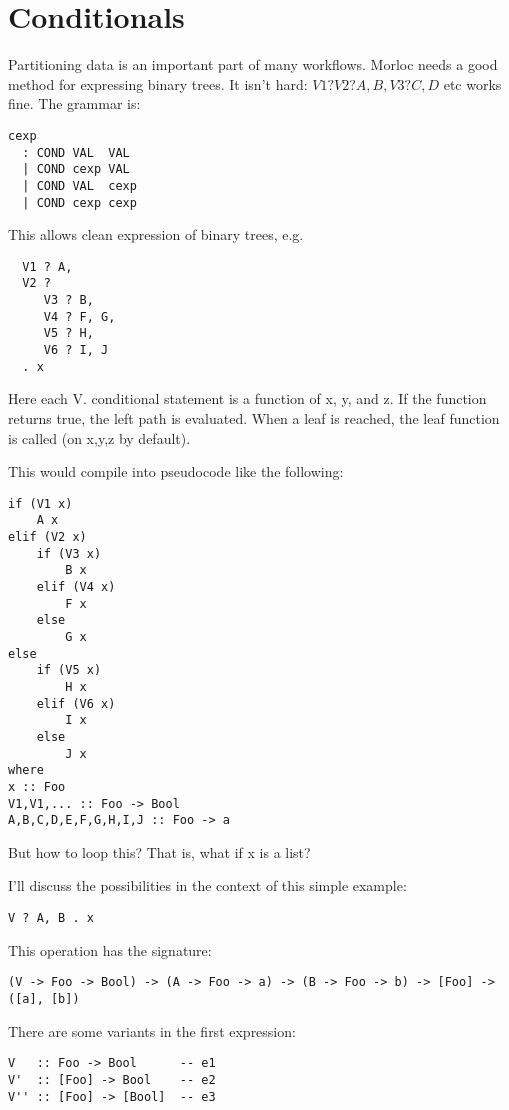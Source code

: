 \documentclass[12pt]{article}
\begin{document}
\section{Conditionals}

Partitioning data is an important part of many workflows. Morloc needs a good
method for expressing binary trees. It isn't hard: $V1 ? V2 ? A, B, V3 ? C, D$ etc
works fine. The grammar is:

\begin{verbatim}
cexp
  : COND VAL  VAL
  | COND cexp VAL
  | COND VAL  cexp
  | COND cexp cexp
\end{verbatim}

This allows clean expression of binary trees, e.g.

\begin{verbatim}
  V1 ? A,
  V2 ?
     V3 ? B,
     V4 ? F, G,
     V5 ? H,
     V6 ? I, J
  . x
\end{verbatim}

Here each V. conditional statement is a function of x, y, and z. If the
function returns true, the left path is evaluated. When a leaf is reached, the
leaf function is called (on x,y,z by default).

This would compile into pseudocode like the following:

\begin{verbatim}
if (V1 x)
    A x
elif (V2 x)
    if (V3 x)
        B x
    elif (V4 x)
        F x
    else
        G x
else
    if (V5 x)
        H x
    elif (V6 x)
        I x
    else
        J x
where
x :: Foo
V1,V1,... :: Foo -> Bool
A,B,C,D,E,F,G,H,I,J :: Foo -> a
\end{verbatim}

But how to loop this? That is, what if x is a list?

I'll discuss the possibilities in the context of this simple example:

\begin{verbatim}
V ? A, B . x
\end{verbatim}

This operation has the signature:

\begin{verbatim}
(V -> Foo -> Bool) -> (A -> Foo -> a) -> (B -> Foo -> b) -> [Foo] -> ([a], [b])
\end{verbatim}

There are some variants in the first expression:

\begin{verbatim}
V   :: Foo -> Bool      -- e1
V'  :: [Foo] -> Bool    -- e2
V'' :: [Foo] -> [Bool]  -- e3
\end{verbatim}
\end{document}
